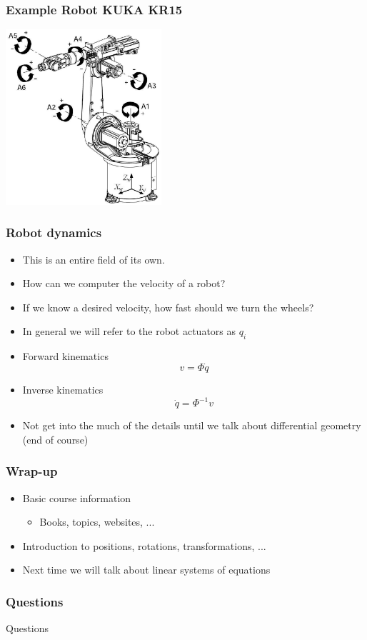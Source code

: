 \documentclass[10pt]{beamer}
\begin{document}
\begin{frame}
  \frametitle{Example Robot KUKA KR15}
  \centerline{\includegraphics[height=6.5cm]{KUKA-KR-15-2}}
\end{frame}

\begin{frame}
  \frametitle{Robot dynamics}
  \begin{itemize}
  \item This is an entire field of its own. 
  \item How can we computer the velocity of a robot? 
  \item If we know a desired velocity, how fast should we turn the wheels? 
  \item In general we will refer to the robot actuators as $q_i$
  \item Forward kinematics
    \[
      v = \Phi \dot{q}
    \]
  \item Inverse kinematics
    \[
      \dot{q} = \Phi^{-1} v
    \]
  \item Not get into the much of the details until we talk about differential geometry (end of course)
  \end{itemize}
\end{frame}

\begin{frame}
  \frametitle{Wrap-up}
  \begin{itemize}
  \item Basic course information
    \begin{itemize}
    \item Books, topics, websites, ...
    \end{itemize}
  \item Introduction to positions, rotations, transformations, ... 
  \item Next time we will talk about linear systems of equations
  \end{itemize}
\end{frame}

\begin{frame}
  \frametitle{Questions}
  \centerline{\Huge Questions}
\end{frame}
\end{document}
